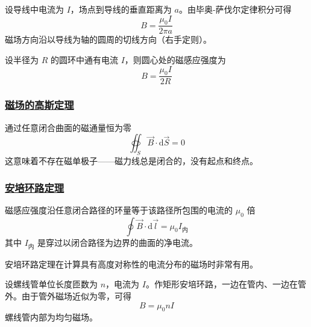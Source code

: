 \begin{example}[无限长直导线的磁场]
    设导线中电流为 $I$，场点到导线的垂直距离为 $a$。由毕奥-萨伐尔定律积分可得
    \begin{equation}
        B = \frac{\mu_0 I}{2\pi a}
    \end{equation}
    磁场方向沿以导线为轴的圆周的切线方向（右手定则）。
\end{example}

\begin{example}[圆形电流中心的磁场]
    设半径为 $R$ 的圆环中通有电流 $I$，则圆心处的磁感应强度为
    \begin{equation}
        B = \frac{\mu_0 I}{2R}
    \end{equation}
\end{example}

\subsubsection{\protect\hyperlink{:}{磁场的高斯定理}}

\begin{theorem}[磁场的高斯定理]
    通过任意闭合曲面的磁通量恒为零
    \begin{equation}
        \oiint_S \vec{B} \cdot \mathrm{d}\vec{S} = 0
    \end{equation}
    这意味着不存在磁单极子——磁力线总是闭合的，没有起点和终点。
\end{theorem}

\subsubsection{\protect\hyperlink{:}{安培环路定理}}

\begin{theorem}[安培环路定理]
    磁感应强度沿任意闭合路径的环量等于该路径所包围的电流的 $\mu_0$ 倍
    \begin{equation}
        \oint \vec{B} \cdot \mathrm{d}\vec{l} = \mu_0 I_{\text{内}}
    \end{equation}
    其中 $I_{\text{内}}$ 是穿过以闭合路径为边界的曲面的净电流。
\end{theorem}

安培环路定理在计算具有高度对称性的电流分布的磁场时非常有用。

\begin{example}[螺线管内的磁场]
    设螺线管单位长度匝数为 $n$，电流为 $I$。作矩形安培环路，一边在管内、一边在管外。由于管外磁场近似为零，可得
    \begin{equation}
        B = \mu_0 n I
    \end{equation}
    螺线管内部为均匀磁场。
\end{example}

